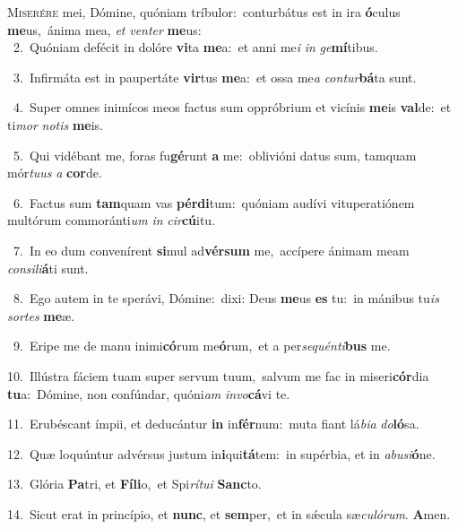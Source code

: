 \lettrine{\initial\textcolor{\initialcolor}{M}}{iserére} mei, Dómine, quóniam tríbulor:~\dagger conturbátus est in ira \textbf{ó}\-culus \textbf{me}\-us,~\star ánima mea, \textit{et} \textit{ven}\-\textit{ter} \textbf{me}\-us:\\
{\numbfont\textcolor{\numbcolor}{~2.}}~Quóniam defécit in dolóre \textbf{vi}\-ta \textbf{me}\-a:~\star et anni me\textit{i} \textit{in} \textit{ge}\-\textbf{mí}tibus.\par
{\numbfont\textcolor{\numbcolor}{~3.}}~Infirmáta est in paupertáte \textbf{vir}\-tus \textbf{me}\-a:~\star et ossa me\textit{a} \textit{con}\-\textit{tur}\textbf{bá}ta sunt.\par
{\numbfont\textcolor{\numbcolor}{~4.}}~Super omnes inimícos meos factus sum oppróbrium et vicínis \textbf{me}\-is \textbf{val}\-de:~\star et ti\textit{mor} \textit{no}\-\textit{tis} \textbf{me}\-is.\par
{\numbfont\textcolor{\numbcolor}{~5.}}~Qui vidébant me, foras fu\-\textbf{gé}\-runt \textbf{a} me:~\star oblivióni datus sum, tamquam mór\-\textit{tu}\-\textit{us} \textit{a} \textbf{cor}\-de.\par
{\numbfont\textcolor{\numbcolor}{~6.}}~Factus sum \textbf{tam}\-quam vas \textbf{pér}\-\textbf{di}tum:~\star quóniam audívi vituperatiónem multórum commoránti\textit{um} \textit{in} \textit{cir}\-\textbf{cú}itu.\par
{\numbfont\textcolor{\numbcolor}{~7.}}~In eo dum convenírent \textbf{si}\-mul ad\-\textbf{vér}\-\textbf{sum} me,~\star accípere ánimam meam \textit{con}\-\textit{si}\textit{li}\textbf{á}ti sunt.\par
{\numbfont\textcolor{\numbcolor}{~8.}}~Ego autem in te sperávi, Dómine:~\dagger dixi: Deus \textbf{me}\-us \textbf{es} tu:~\star in mánibus tu\textit{is} \textit{sor}\-\textit{tes} \textbf{me}\-æ.\par
{\numbfont\textcolor{\numbcolor}{~9.}}~Eripe me de manu inimi\-\textbf{có}\-rum me\-\textbf{ó}\-rum,~\star et a per\-\textit{se}\-\textit{quén}\textit{ti}\textbf{bus} me.\par
{\numbfont\textcolor{\numbcolor}{10.}}~Illústra fáciem tuam super servum tuum,~\dagger salvum me fac in miseri\-\textbf{cór}\-dia \textbf{tu}\-a:~\star Dómine, non confúndar, quóni\textit{am} \textit{in}\-\textit{vo}\textbf{cá}vi te.\par
{\numbfont\textcolor{\numbcolor}{11.}}~Erubéscant ímpii, et deducántur \textbf{in} in\-\textbf{fér}\-num:~\star muta fiant lá\-\textit{bi}\-\textit{a} \textit{do}\-\textbf{ló}sa.\par
{\numbfont\textcolor{\numbcolor}{12.}}~Quæ loquúntur advérsus justum in\-\textbf{i}\-qui\-\textbf{tá}\-tem:~\star in supérbia, et in \textit{ab}\-\textit{u}\textit{si}\textbf{ó}ne.\par
{\numbfont\textcolor{\numbcolor}{13.}}~Glória \textbf{Pa}\-tri, et \textbf{Fí}\-\textbf{li}o,~\star et Spi\-\textit{rí}\-\textit{tu}\textit{i} \textbf{Sanc}\-to.\par
{\numbfont\textcolor{\numbcolor}{14.}}~Sicut erat in princípio, et \textbf{nunc}\-, et \textbf{sem}\-per,~\star et in sǽcula sæ\-\textit{cu}\-\textit{ló}\textit{rum}. \textbf{A}\-men.\par
